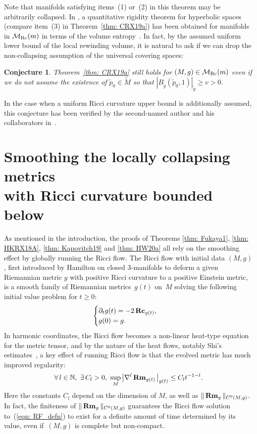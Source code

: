 \documentclass[10pt,a4paper]{amsart}
\numberwithin{equation}{section}
\newtheorem{Conjecture}[Theorem]{Conjecture}
\newcommand{\Rm}{\operatorname{\bf Rm}}
\newcommand{\Rc}{\operatorname{\bf Rc}}
\begin{document}
Note that manifolds satisfying items~(1) or~(2) in this theorem may be
arbitrarily collapsed. In \cite[Theorem~D]{CRX19}, a quantitative rigidity
theorem for hyperbolic spaces (compare item~(3) in Theorem~\ref{thm: CRX19a})
has been obtained for manifolds in $\mathcal{M}_{\rm Rc}(m)$ in terms of the volume
entropy~\cite{LW10}. In fact, by the assumed uniform lower bound of the local
rewinding volume, it is natural to ask if we can drop the non-collapsing
assumption of the universal covering spaces:
\begin{Conjecture}
Theorem~{\rm \ref{thm: CRX19a}} still holds for $(M,g)\in \mathcal{M}_{\rm Rc}(m)$ even if
we do not assume the existence of $\tilde{p}_0\in \tilde{M}$ so that
$|B_{\tilde{g}} (\tilde{p}_0,1)|_{\tilde{g}}\ge v>0$.
\end{Conjecture}
In the case when a uniform Ricci curvature upper bound is additionally assumed,
this conjecture has been verified by the second-named author and his
collaborators in~\cite{CRX18}.

\section[Smoothing the locally collapsing metrics with Ricci curvature bounded
below]{Smoothing the locally collapsing metrics\\ with Ricci curvature bounded
below}\label{section4}

As mentioned in the introduction, the proofs of Theorems \ref{thm: Fukaya1},
\ref{thm: HKRX18A}, \ref{thm: Kapovitch19} and \ref{thm: HW20a} all rely on the
smoothing effect by globally running the Ricci flow. The Ricci flow with
initial data $(M,g)$, first introduced by Hamilton \cite{Hamilton} on closed
$3$-manifolds to deform a given Riemannian metric $g$ with positive Ricci
curvature to a positive Einstein metric, is a smooth family of Riemannian
metrics~$g(t)$ on~$M$ solving the following initial value problem for $t\ge 0$:
\begin{align}\label{eqn: RF_defn}
\begin{cases}
\partial_tg(t) = -2\Rc_{g(t)},\\
g(0) = g.
\end{cases}
\end{align}
In harmonic coordinates, the Ricci flow becomes a non-linear
heat-type equation for the metric tensor, and by the nature of the heat flows,
notably Shi's estimates~\cite{Shi}, a key effect of running Ricci flow is that
the evolved metric has much improved regularity:
\begin{align}\label{eqn: Shi_estimate}
\forall\, l\in \mathbb{N},\ \exists\, C_l>0,\ \sup_M\big|\nabla^l
\Rm_{g(t)}\big|_{g(t)} \le C_lt^{-1-l}.
\end{align}
Here the constants $C_l$ depend on the dimension of $M$, as well as
$\|\Rm_g\|_{C^0(M,g)}$. In fact, the finiteness of
$\|\Rm_g\|_{C^0(M,g)}$ guarantees the Ricci flow solution to~(\ref{eqn: RF_defn}) to exist for a definite amount of time determined by
its value, even if~$(M,g)$ is complete but non-compact.
\end{document}
